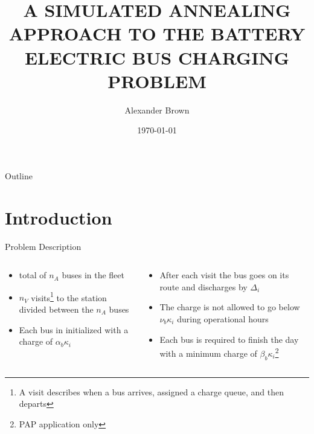 \documentclass[bigger]{beamer}
\author{Alexander Brown}
\date{\today}
\title{A SIMULATED ANNEALING APPROACH TO THE BATTERY ELECTRIC BUS CHARGING PROBLEM}
\begin{document}
\maketitle
\begin{frame}{Outline}
\tableofcontents
\end{frame}


\section{Introduction}
\label{sec:org1502e2d}
\begin{frame}[label={sec:org74eedf6}]{Problem Description}
\begin{columns}
\begin{column}{0.5\columnwidth}
\begin{itemize}
\item total of \(n_A\) buses in the fleet
\item \(n_V\) visits\footnote{A visit describes when a bus arrives, assigned a charge queue, and then departs} to the station divided between the \(n_A\) buses
\item Each bus in initialized with a charge of \(\alpha_b \kappa_i\)
\end{itemize}
\end{column}

\begin{column}{0.5\columnwidth}
\begin{itemize}
\item After each visit the bus goes on its route and discharges by \(\Delta_i\)
\item The charge is not allowed to go below \(\nu_b \kappa_i\) during operational hours
\item Each bus is required to finish the day with a minimum charge of \(\beta_b \kappa_i\)\footnote{PAP application only}
\end{itemize}
\end{column}
\end{columns}
\end{frame}
\end{document}
